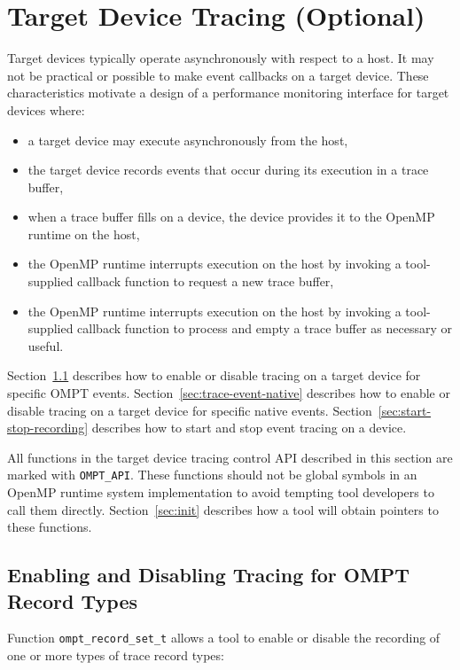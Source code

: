 \documentclass{article}
\begin{document}
\section{Target Device Tracing (Optional)}
\label{sec:target-device-records}

Target devices typically operate asynchronously with respect to a host. It may not be practical or possible to make event callbacks on a target device. These characteristics motivate a design of a performance monitoring interface for target devices where: 
\begin{itemize}
\item a target device may execute asynchronously from the host,
\item the target device records events that occur during its execution in a trace buffer,
\item when a trace buffer fills on a device,  the device provides it to the OpenMP runtime  on the host,
\item the OpenMP runtime  interrupts execution on the host by invoking a tool-supplied callback function to request a new trace buffer,
\item the OpenMP runtime  interrupts execution on the host by invoking a tool-supplied callback function to process and empty a trace buffer as necessary or useful.
\end{itemize}


 Section~\ref{sec:trace-event}  describes how to enable or disable tracing on a target device for specific OMPT events. 
  Section~\ref{sec:trace-event-native}  describes how to enable or disable tracing on a target device for specific native events. Section~\ref{sec:start-stop-recording} describes how to start and stop event tracing on a device. 
  
All functions in the target device tracing control API described in this section are marked with \verb|OMPT_API|. These functions should not be global symbols in an OpenMP runtime system implementation to avoid tempting tool developers to call them directly. Section~\ref{sec:init} describes how a tool will obtain pointers to these functions.



\subsection{Enabling and Disabling Tracing for OMPT Record Types}
\label{sec:trace-event}
Function \verb|ompt_record_set_t| allows a tool to enable or disable the recording of one or more types of trace record types:
\end{document}
